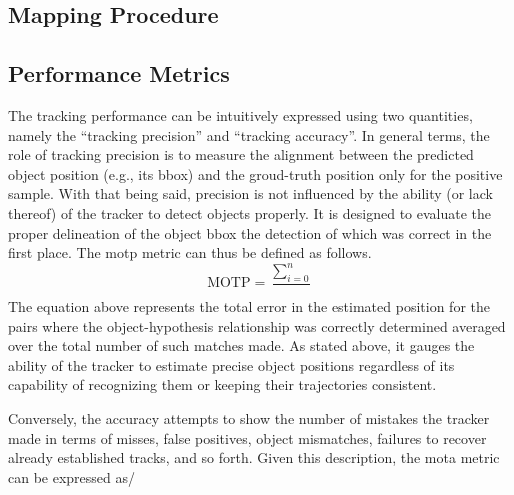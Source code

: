 \subsection{Mapping Procedure}



\subsection{Performance Metrics}

The tracking performance can be intuitively expressed using two quantities, namely the ``tracking precision'' and ``tracking accuracy''. In general terms, the role of tracking precision is to measure the alignment between the predicted object position (e.g., its \gls{bbox}) and the groud-truth position only for the positive sample. With that being said, precision is not influenced by the ability (or lack thereof) of the tracker to detect objects properly. It is designed to evaluate the proper delineation of the object \gls{bbox} the detection of which was correct in the first place. The 
\gls{motp} metric can thus be defined as follows.
\begin{equation}
    \text{MOTP} = \frac{\sum_{i=0}^{n}}{}
\end{equation}
The equation above represents the total error in the estimated position for the pairs where the object-hypothesis relationship was correctly determined averaged over the total number of such matches made. As stated above, it gauges the ability of the tracker to estimate precise object positions regardless of its capability of recognizing them or keeping their trajectories consistent.

Conversely, the accuracy attempts to show the number of mistakes the tracker made in terms of misses, false positives, object mismatches, failures to recover already established tracks, and so forth. Given this description, the \gls{mota} metric can be expressed as/
